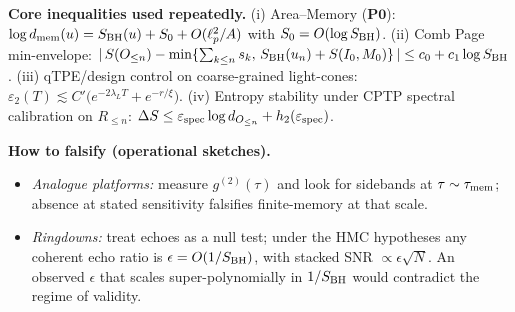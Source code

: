 \documentclass[aps,prd,preprint,onecolumn,superscriptaddress,nofootinbib,longbibliography,floatfix,11pt,showpacs,showkeys]{revtex4-2}
\theoremstyle{plain}
\theoremstyle{definition}
\theoremstyle{remark}
\begin{document}
\smallskip
\noindent\textbf{Core inequalities used repeatedly.}
(i) Area--Memory (\(\mathbf{P0}\)): \(\log d_{\rm mem}(u)=S_{\rm BH}(u)+S_0+O(\ell_p^2/A)\) with \(S_0=O(\log S_{\rm BH})\).
(ii) Comb Page min-envelope: \(|\,S(O_{\le n})-\min\{\sum_{k\le n}s_k,\,S_{\rm BH}(u_n)+S(I_0,M_0)\}\,|\le c_0+c_1\log S_{\rm BH}\).
(iii) qTPE/design control on coarse-grained light-cones: \(\varepsilon_2(T)\lesssim C'\big(e^{-2\lambda_L T}+e^{-r/\xi}\big)\).
(iv) Entropy stability under CPTP spectral calibration on \(R_{\le n}\): \(\Delta S \le \varepsilon_{\rm spec}\log d_{O_{\le n}}+h_2(\varepsilon_{\rm spec})\).

\smallskip
\noindent\textbf{How to falsify (operational sketches).}
\begin{itemize}
\item \emph{Analogue platforms:} measure \(g^{(2)}(\tau)\) and look for sidebands at \(\tau\sim\tau_{\rm mem}\); absence at stated sensitivity falsifies finite-memory at that scale.
\item \emph{Ringdowns:} treat echoes as a null test; under the HMC hypotheses any coherent echo ratio is \(\epsilon=O(1/S_{\rm BH})\), with stacked SNR \(\propto \epsilon\sqrt{N}\). An observed \(\epsilon\) that scales super-polynomially in \(1/S_{\rm BH}\) would contradict the regime of validity.
\end{itemize}
\end{document}
